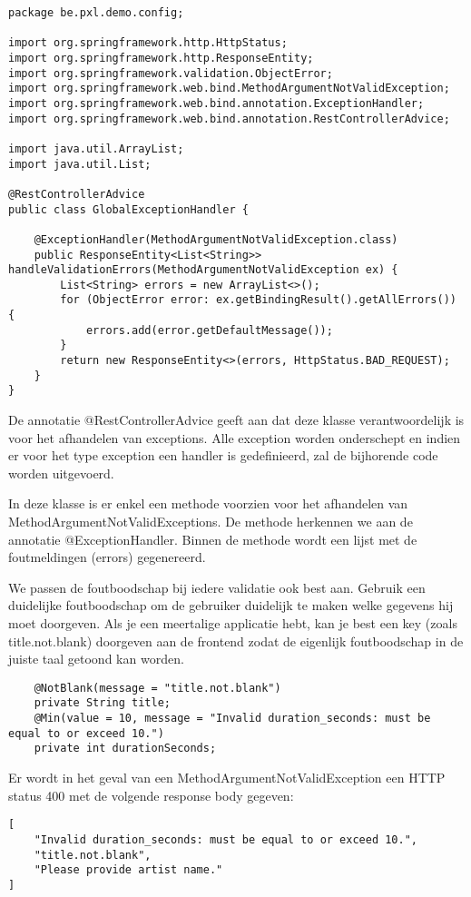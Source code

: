 \begin{lstlisting}
package be.pxl.demo.config;

import org.springframework.http.HttpStatus;
import org.springframework.http.ResponseEntity;
import org.springframework.validation.ObjectError;
import org.springframework.web.bind.MethodArgumentNotValidException;
import org.springframework.web.bind.annotation.ExceptionHandler;
import org.springframework.web.bind.annotation.RestControllerAdvice;

import java.util.ArrayList;
import java.util.List;

@RestControllerAdvice
public class GlobalExceptionHandler {

	@ExceptionHandler(MethodArgumentNotValidException.class)
	public ResponseEntity<List<String>> handleValidationErrors(MethodArgumentNotValidException ex) {
		List<String> errors = new ArrayList<>();
		for (ObjectError error: ex.getBindingResult().getAllErrors()) {
			errors.add(error.getDefaultMessage());
		}
		return new ResponseEntity<>(errors, HttpStatus.BAD_REQUEST);
	}
}
\end{lstlisting}


De annotatie @RestControllerAdvice geeft aan dat deze klasse verantwoordelijk is voor het afhandelen van exceptions. Alle exception worden onderschept en indien er voor het type exception een handler is gedefinieerd, zal de bijhorende code worden uitgevoerd. 

In deze klasse is er enkel een methode voorzien voor het afhandelen van MethodArgumentNotValidExceptions. De methode herkennen we aan de annotatie @ExceptionHandler. Binnen de methode wordt een lijst met de foutmeldingen (errors) gegenereerd.

We passen de foutboodschap bij iedere validatie ook best aan.  Gebruik een duidelijke foutboodschap om de gebruiker duidelijk te maken welke gegevens hij moet doorgeven.
Als je een meertalige applicatie hebt, kan je best een key (zoals title.not.blank) doorgeven aan de frontend zodat de eigenlijk foutboodschap in de juiste taal getoond kan worden.


\begin{lstlisting}
	@NotBlank(message = "title.not.blank")
	private String title;
	@Min(value = 10, message = "Invalid duration_seconds: must be equal to or exceed 10.")
	private int durationSeconds;
\end{lstlisting}

Er wordt in het geval van een MethodArgumentNotValidException een HTTP status 400 met de volgende response body gegeven:
\begin{verbatim}
[
	"Invalid duration_seconds: must be equal to or exceed 10.",
	"title.not.blank",
	"Please provide artist name."
]
\end{verbatim}


